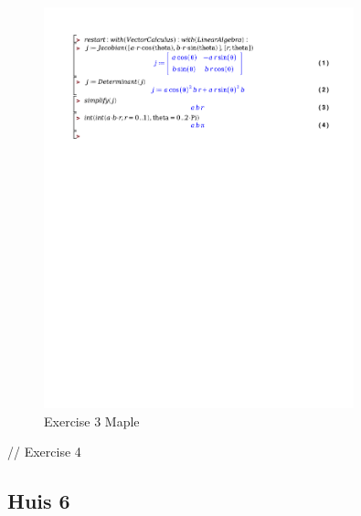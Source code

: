 \documentclass[a4paper]{report}
\begin{document}
\begin{figure}[H]
	\centering
	\includegraphics[width=0.8\textwidth]{exercises/wc_5_ex_3.pdf}
	\caption{Exercise 3 Maple}
	\label{fig:wc_5_ex_3_maple}
\end{figure}

// Exercise 4


\subsection*{Huis 6}
\end{document}
